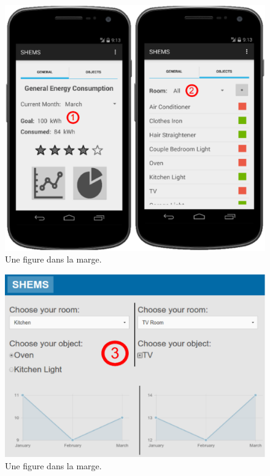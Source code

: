 \documentclass{chi-ext}
\begin{document}
{\begin{figure}
  \begin{center}
  \includegraphics[width=\marginparwidth]{images/mobile_goal-filter.eps}
  \caption{Une figure dans la marge.}
  \label{fig:marginparsample}
  \end{center}  
\end{figure}

\begin{figure}
  \begin{center}
  \includegraphics[width=\marginparwidth]{images/web1-comparator.eps}
  \caption{Une figure dans la marge.}
  \label{fig:marginparsample}
  \end{center}  
\end{figure}
}
\end{document}
